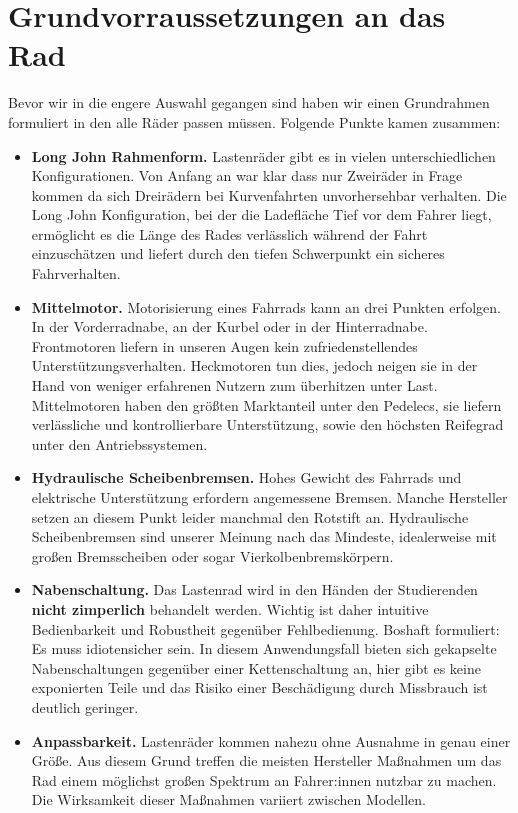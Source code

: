 \documentclass[a4paper,ngerman, 14pt] {scrartcl}
\begin{document}
\section{Grundvorraussetzungen an das Rad}
Bevor wir in die engere Auswahl gegangen sind haben wir einen Grundrahmen formuliert in den alle Räder passen müssen. Folgende Punkte kamen zusammen:\\
\begin{itemize}
    \item \textbf{Long John Rahmenform.} Lastenräder gibt es in vielen unterschiedlichen Konfigurationen. Von Anfang an war klar dass nur Zweiräder in Frage kommen da sich Dreirädern bei Kurvenfahrten unvorhersehbar verhalten. Die Long John Konfiguration, bei der die Ladefläche Tief vor dem Fahrer liegt, ermöglicht es die Länge des Rades verlässlich während der Fahrt einzuschätzen und liefert durch den tiefen Schwerpunkt ein sicheres Fahrverhalten.
    \item \textbf{Mittelmotor.} Motorisierung eines Fahrrads kann an drei Punkten erfolgen. In der Vorderradnabe, an der Kurbel oder in der Hinterradnabe. Frontmotoren liefern in unseren Augen kein zufriedenstellendes Unterstützungsverhalten. Heckmotoren tun dies, jedoch neigen sie in der Hand von weniger erfahrenen Nutzern zum überhitzen unter Last. Mittelmotoren haben den größten Marktanteil unter den Pedelecs, sie liefern verlässliche und kontrollierbare Unterstützung, sowie den höchsten Reifegrad unter den Antriebssystemen.
    \item \textbf{Hydraulische Scheibenbremsen.} Hohes Gewicht des Fahrrads und elektrische Unterstützung erfordern angemessene Bremsen. Manche Hersteller setzen an diesem Punkt leider manchmal den Rotstift an. Hydraulische Scheibenbremsen sind unserer Meinung nach das Mindeste, idealerweise mit großen Bremsscheiben oder sogar Vierkolbenbremskörpern.
    \item \textbf{Nabenschaltung.} Das Lastenrad wird in den Händen der Studierenden \textbf{nicht zimperlich} behandelt werden. Wichtig ist daher intuitive Bedienbarkeit und Robustheit gegenüber Fehlbedienung. Boshaft formuliert: Es muss idiotensicher sein. In diesem Anwendungsfall bieten sich gekapselte Nabenschaltungen gegenüber einer Kettenschaltung an, hier gibt es keine exponierten Teile und das Risiko einer Beschädigung durch Missbrauch ist deutlich geringer.
    \item \textbf{Anpassbarkeit.} Lastenräder kommen nahezu ohne Ausnahme in genau einer Größe. Aus diesem Grund treffen die meisten Hersteller Maßnahmen um das Rad einem möglichst großen Spektrum an Fahrer:innen nutzbar zu machen. Die Wirksamkeit dieser Maßnahmen variiert zwischen Modellen.
\end{itemize}
\newpage
\end{document}
